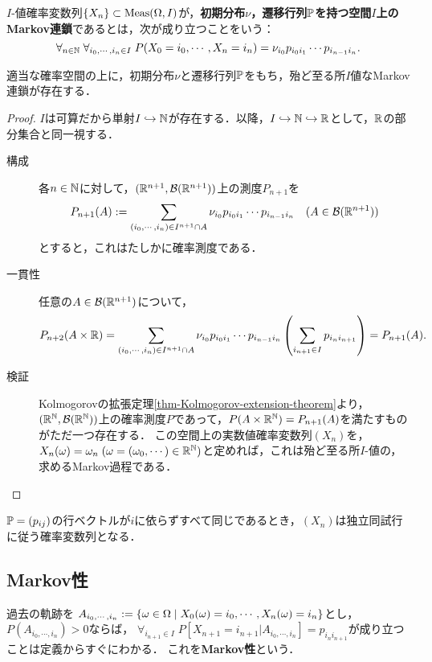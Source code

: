 \documentclass[uplatex,dvipdfmx]{jsreport}
\begin{document}
\begin{definition}
    $I$-値確率変数列$\{X_n\}\subset\mathrm{Meas}(\Omega,I)$が，\textbf{初期分布$\nu$，遷移行列$\mathbb{P}$を持つ空間$I$上のMarkov連鎖}であるとは，次が成り立つことをいう：
    \[\forall_{n\in\mathbb{N}}\;\forall_{i_0,\cdots,i_n\in I}\;P(X_0=i_0,\cdots,X_n=i_n)=\nu_{i_0}p_{i_0i_1}\cdots p_{i_{n-1}i_n}.\]
\end{definition}

\begin{proposition}
    適当な確率空間の上に，初期分布$\nu$と遷移行列$\mathbb{P}$をもち，殆ど至る所$I$値なMarkov連鎖が存在する．
\end{proposition}
\begin{proof}
    $I$は可算だから単射$I\hookrightarrow\mathbb{N}$が存在する．以降，$I\hookrightarrow\mathbb{N}\hookrightarrow\mathbb{R}$として，$\mathbb{R}$の部分集合と同一視する．
    \begin{description}
        \item[構成] 各$n\in\mathbb{N}$に対して，$(\mathbb{R}^{n+1},\mathcal{B}(\mathbb{R}^{n+1}))$上の測度$P_{n+1}$を
        \[P_{n+1}(A):=\sum_{(i_0,\cdots,i_n)\in I^{n+1}\cap A}\nu_{i_0}p_{i_0i_1}\cdots p_{i_{n-1}i_n}\quad(A\in\mathcal{B}(\mathbb{R}^{n+1}))\]
        とすると，これはたしかに確率測度である．
        \item[一貫性] 任意の$A\in\mathcal{B}(\mathbb{R}^{n+1})$について，
        \[P_{n+2}(A\times\mathbb{R})=\sum_{(i_0,\cdots,i_n)\in I^{n+1}\cap A}\nu_{i_0}p_{i_0i_1}\cdots p_{i_{n-1}i_n}\left(\sum_{i_{n+1}\in I}p_{i_ni_{n+1}}\right)=P_{n+1}(A).\]
        \item[検証] Kolmogorovの拡張定理\ref{thm-Kolmogorov-extension-theorem}より，$(\mathbb{R}^{\mathbb{N}},\mathcal{B}(\mathbb{R}^{\mathbb{N}}))$上の確率測度$P$であって，$P(A\times\mathbb{R}^{\mathbb{N}})=P_{n+1}(A)$を満たすものがただ一つ存在する．
        この空間上の実数値確率変数列$(X_n)$を，$X_n(\omega)=\omega_n\;(\omega=(\omega_0,\cdots)\in\mathbb{R}^{\mathbb{N}})$と定めれば，これは殆ど至る所$I$-値の，求めるMarkov過程である．
    \end{description}
\end{proof}

\begin{example}[i.i.d.はMarkov過程]
    $\mathbb{P}=(p_{ij})$の行ベクトルが$i$に依らずすべて同じであるとき，$(X_n)$は独立同試行に従う確率変数列となる．
\end{example}

\subsection{Markov性}

\begin{definition}
    過去の軌跡を
    $A_{i_0,\cdots,i_n}:=\left\{\omega\in\Omega\mid X_0(\omega)=i_0,\cdots,X_n(\omega)=i_n\right\}$とし，$P(A_{i_0,\cdots,i_n})>0$ならば，
    $\forall_{i_{n+1}\in I}\;P[X_{n+1}=i_{n+1}|A_{i_0,\cdots,i_n}]=p_{i_ni_{n+1}}$が成り立つことは定義からすぐにわかる．
    これを\textbf{Markov性}という．
\end{definition}
\end{document}
